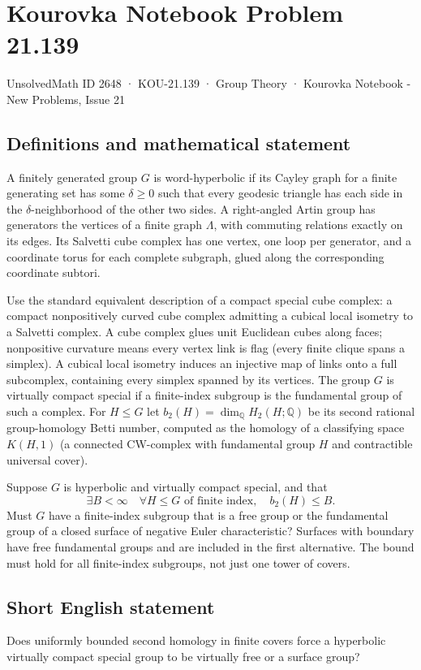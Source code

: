 \documentclass[11pt,a4paper]{article}
\begin{document}
\section*{Kourovka Notebook Problem 21.139}\label{2648}
{\small UnsolvedMath ID 2648 · KOU-21.139 · Group Theory · Kourovka Notebook - New Problems, Issue 21}
\subsection{Definitions and mathematical statement}
A finitely generated group $G$ is word-hyperbolic if its Cayley graph for a
finite generating set has some $\delta\geq0$ such that every geodesic triangle
has each side in the $\delta$-neighborhood of the other two sides.
A right-angled Artin group has generators the vertices of a finite graph
$\Lambda$, with commuting relations exactly on its edges. Its Salvetti cube
complex has one vertex, one loop per generator, and a coordinate torus for
each complete subgraph, glued along the corresponding coordinate subtori.

Use the standard equivalent description of a compact special cube complex:
a compact nonpositively curved cube complex admitting a cubical local isometry
to a Salvetti complex. A cube complex glues unit Euclidean cubes along faces;
nonpositive curvature means every vertex link is flag (every finite clique
spans a simplex). A cubical local isometry induces an injective map of links
onto a full subcomplex, containing every simplex spanned by its vertices.
The group $G$ is virtually compact special if a
finite-index subgroup is the fundamental group of such a complex.
For $H\leq G$ let $b_2(H)=\dim_{\mathbb Q}H_2(H;\mathbb Q)$ be its second
rational group-homology Betti number, computed as the homology of a
classifying space $K(H,1)$ (a connected CW-complex with fundamental group
$H$ and contractible universal cover).

Suppose $G$ is hyperbolic and virtually compact special, and that
\[
\exists B<\infty\quad\forall H\leq G\text{ of finite index},\quad b_2(H)\leq B.
\]
Must $G$ have a finite-index subgroup that is a free group or the fundamental
group of a closed surface of negative Euler characteristic? Surfaces with
boundary have free fundamental groups and are included in the first alternative.
The bound must hold for all finite-index subgroups, not just one tower of covers.
\subsection{Short English statement}
Does uniformly bounded second homology in finite covers force a hyperbolic virtually compact special group to be virtually free or a surface group?
\end{document}
